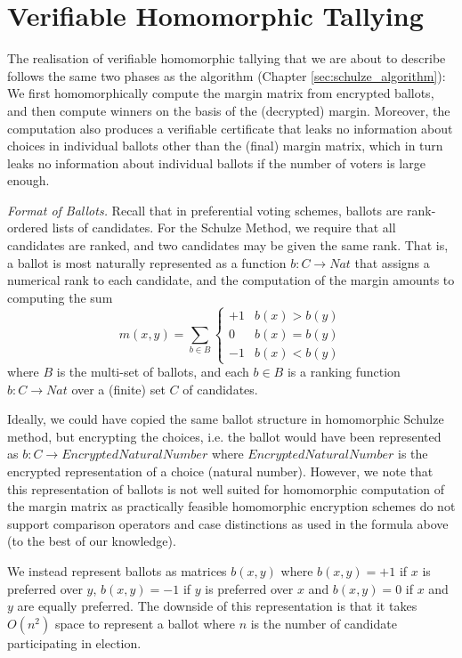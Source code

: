   
 \section{Verifiable Homomorphic Tallying}
\label{sec:verifiable_homomorphic}
The realisation of verifiable homomorphic tallying that we are about to
describe follows the same two phases as the algorithm (Chapter \ref{sec:schulze_algorithm}): 
We first homomorphically compute the margin matrix from encrypted ballots, and then compute
winners on the basis of the (decrypted) margin. Moreover, the computation also
produces a verifiable certificate that leaks no information about
choices in individual ballots other than the (final) margin matrix, which in
turn leaks no information about individual ballots if the number of
voters is large enough. 


\smallskip\noindent\emph{Format of Ballots.} Recall that in preferential voting
schemes, ballots are rank-ordered lists of candidates. For the
Schulze Method, we require that all candidates are ranked, and two
candidates may be given the same rank. That is, a ballot is most
naturally represented as a function $b: C \to Nat$ that assigns a
numerical rank to each candidate, and the computation of the margin
amounts to computing the sum
\[ m(x, y) = \sum_{b \in B} \begin{cases} +1 & b(x) > b(y) \\ 0 &
b(x) = b(y) \\ -1 & b(x) < b(y) \end{cases} \]
where $B$ is the multi-set of ballots, and each $b \in B$ is a
ranking function $b: C \to Nat$ over a (finite) set $C$ of
candidates. 

Ideally, we could have copied the same ballot structure in homomorphic Schulze method, 
but encrypting the choices, i.e. the ballot would have been represented as $b: C \to EncryptedNaturalNumber$
where $EncryptedNaturalNumber$ is the encrypted representation of a choice (natural number).
However, we note that this representation of ballots is not well suited for
homomorphic computation of the margin matrix as practically feasible
homomorphic encryption schemes do not support comparison operators
and case distinctions as used in the formula above (to the best of our knowledge).

We instead represent ballots as matrices
$b(x, y)$ where $b(x, y) = +1$ if $x$ is preferred
over $y$, $b(x, y) = -1$ if $y$ is preferred over $x$ and $b(x, y) =
0$ if $x$ and $y$ are equally preferred. The downside of this representation 
is that it takes $O(n^2)$ space to represent a ballot where $n$ is the number 
of candidate participating in election. 

